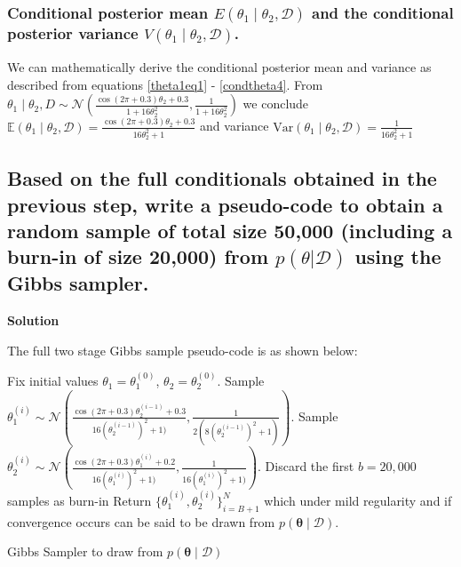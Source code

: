 \documentclass[12pt]{article}
\begin{document}
\subsubsection{Conditional posterior mean \(E(\theta_1 \mid \theta_2, \mathcal{D})\) and the conditional posterior variance \(V(\theta_1 \mid \theta_2, \mathcal{D})\).}

We can mathematically derive the conditional posterior mean and variance as described from equations \ref{theta1eq1} - \ref{condtheta4}.  From $\theta_1 \mid \theta_2, D \sim \mathcal{N} \left( \frac{\cos(2\pi+0.3)\theta_2 + 0.3}{1 + 16\theta_2^2}, \frac{1}{1 + 16\theta_2^2} \right)$ we conclude
$\mathbb{E}(\theta_1 \mid \theta_2, \mathcal{D}) = \frac{\cos(2\pi + 0.3)\theta_2 + 0.3}{16\theta_2^2 + 1}$ and variance  $  \mathrm{Var}(\theta_1 \mid \theta_2, \mathcal{D}) = \frac{1}{16\theta_2^2 + 1}$

\subsection{ Based on the full conditionals obtained in the previous step, write a pseudo-code to obtain a random sample of total size 50,000 (including a burn-in of size 20,000) from $p(\theta | \mathcal{D})$ using the Gibbs sampler.} 

\textbf{Solution}

The full two stage Gibbs sample pseudo-code is as shown below:
\begin{algorithm}
\begin{algorithmic}[1]
\State Fix initial values \( \theta_1 = \theta_1^{(0)} \), \( \theta_2 = \theta_2^{(0)} \).
    \State Sample \( \theta_1^{(i)} \sim \mathcal{N}\left(\frac{\cos(2\pi + 0.3)\theta_2^{(i-1)} + 0.3}{16(\theta_2^{(i-1)})^2 + 1)}, \frac{1}{2(8(\theta_2^{(i-1)})^2 + 1)}\right) \).
    \State Sample \( \theta_2^{(i)} \sim \mathcal{N}\left(\frac{\cos(2\pi + 0.3)\theta_1^{(i)} + 0.2}{16(\theta_1^{(i)})^2 + 1)}, \frac{1}{16(\theta_1^{(i)})^2 + 1)}\right) \).
\EndFor
\State Discard the first \( b = 20,000 \) samples as burn-in
\State Return \( \{\theta_1^{(i)}, \theta_2^{(i)}\}_{i=B+1}^{N} \) which under mild regularity and if convergence occurs can be said to be drawn from \( p(\boldsymbol{\theta} \mid \mathcal{D}) \).
\end{algorithmic}
\caption{ Gibbs Sampler to draw from \( p(\boldsymbol{\theta} \mid \mathcal{D}) \)}
\label{algo:gs}
\end{algorithm}
\end{document}
